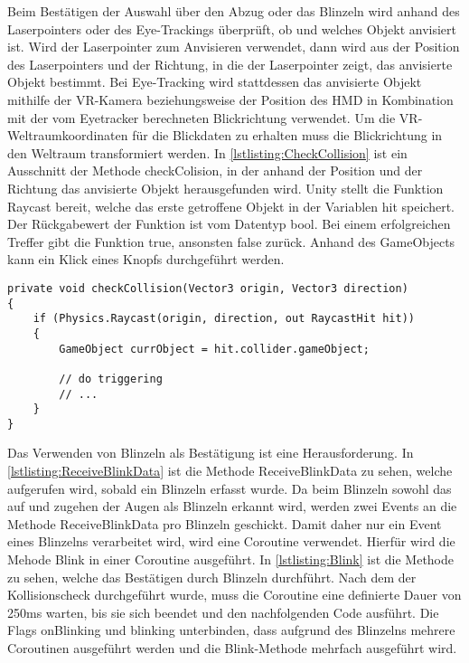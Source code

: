 Beim Bestätigen der Auswahl über den Abzug oder das Blinzeln wird anhand des Laserpointers oder des Eye-Trackings überprüft, ob und welches Objekt anvisiert ist. Wird der Laserpointer zum Anvisieren verwendet, dann wird aus der Position des Laserpointers und der Richtung, in die der Laserpointer zeigt, das anvisierte Objekt bestimmt. Bei Eye-Tracking wird stattdessen das anvisierte Objekt mithilfe der \ac{VR}-Kamera beziehungsweise der Position des \ac{HMD} in Kombination mit der vom Eyetracker berechneten Blickrichtung verwendet. Um die \ac{VR}-Weltraumkoordinaten für die Blickdaten zu erhalten muss die Blickrichtung in den Weltraum transformiert werden. In \autoref{lstlisting:CheckCollision} ist ein Ausschnitt der Methode checkColision, in der anhand der Position und der Richtung das anvisierte Objekt herausgefunden wird. Unity stellt die Funktion Raycast bereit, welche das erste getroffene Objekt in der Variablen hit speichert. Der Rückgabewert der Funktion ist vom Datentyp bool. Bei einem erfolgreichen Treffer gibt die Funktion true, ansonsten false zurück. Anhand des GameObjects kann ein Klick eines Knopfs durchgeführt werden.

\begin{lstlisting}[caption=Ausschnitt aus Methode checkCollision,label=lstlisting:CheckCollision]
private void checkCollision(Vector3 origin, Vector3 direction)
{
	if (Physics.Raycast(origin, direction, out RaycastHit hit))
	{
		GameObject currObject = hit.collider.gameObject;
		
		// do triggering
		// ...
	}
}
\end{lstlisting}

Das Verwenden von Blinzeln als Bestätigung ist eine Herausforderung. In \autoref{lstlisting:ReceiveBlinkData} ist die Methode ReceiveBlinkData zu sehen, welche aufgerufen wird, sobald ein Blinzeln erfasst wurde. Da beim Blinzeln sowohl das auf und zugehen der Augen als Blinzeln erkannt wird, werden zwei Events an die Methode ReceiveBlinkData pro Blinzeln geschickt. Damit daher nur ein Event eines Blinzelns verarbeitet wird, wird eine Coroutine verwendet. Hierfür wird die Mehode Blink in einer Coroutine ausgeführt. In \autoref{lstlisting:Blink} ist die Methode zu sehen, welche das Bestätigen durch Blinzeln durchführt. Nach dem der Kollisionscheck durchgeführt wurde, muss die Coroutine eine definierte Dauer von 250ms warten, bis sie sich beendet und den nachfolgenden Code ausführt. Die Flags {\ttfamily onBlinking} und {\ttfamily blinking} unterbinden, dass aufgrund des Blinzelns mehrere Coroutinen ausgeführt werden und die Blink-Methode mehrfach ausgeführt wird.

